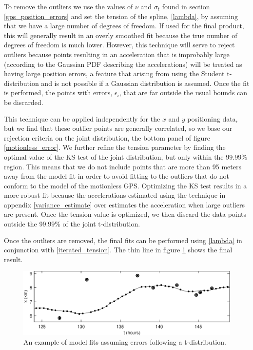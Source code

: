 \documentclass[10pt,journal]{IEEEtran}
\begin{document}
To remove the outliers we use the values of $\nu$ and $\sigma_t$ found in section \ref{gps_position_errors} and set the tension of the spline, \ref{lambda}, by assuming that we have a large number of degrees of freedom. If used for the final product, this will generally result in an overly smoothed fit because the true number of degrees of freedom is much lower. However, this technique will serve to reject outliers because points resulting in an acceleration that is improbably large (according to the Gaussian PDF describing the accelerations) will be treated as having large position errors, a feature that arising from using the Student t-distribution and is not possible if a Gaussian distribution is assumed. Once the fit is performed, the points with errors, $\epsilon_i$, that are far outside the usual bounds can be discarded. 

This technique can be applied independently for the $x$ and $y$ positioning data, but we find that these outlier points are generally correlated, so we base our rejection criteria on the joint distribution, the bottom panel of figure \ref{motionless_error}. We further refine the tension parameter by finding the optimal value of the KS test of the joint distribution, but only within the 99.99\% region. This means that we do not include points that are more than 95 meters away from the model fit in order to avoid fitting to the outliers that do not conform to the model of the motionless GPS. Optimizing the KS test results in a more robust fit because the accelerations estimated using the technique in appendix \ref{variance_estimate} over estimates the acceleration when large outliers are present. Once the tension value is optimized, we then discard the data points outside the 99.99\% of the joint t-distribution.

Once the outliers are removed, the final fits can be performed using \ref{lambda} in conjunction with \ref{iterated_tension}. The thin line in figure \ref{tdistributionfit} shows the final result.

\begin{figure}[t]
  \centerline{\includegraphics[width=39pc,angle=0]{tdistributionfit}}
  
  \caption{An example of model fits assuming errors following a t-distribution.}
  \label{tdistributionfit}
\end{figure}
\end{document}

